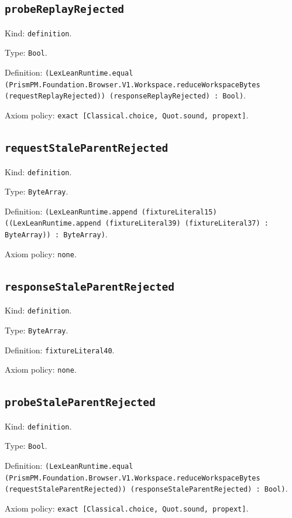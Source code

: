 \documentclass[11pt]{article}
\begin{document}
\subsection*{\texttt{probeReplayRejected}}
\noindent Kind: \texttt{definition}.\par
\noindent Type: \texttt{Bool}.\par
\noindent Definition: \texttt{(LexLeanRuntime.equal (PrismPM.Foundation.Browser.V1.Workspace.reduceWorkspaceBytes (requestReplayRejected)) (responseReplayRejected) : Bool)}.\par
\noindent Axiom policy: \texttt{exact [Classical.choice, Quot.sound, propext]}.\par
\subsection*{\texttt{requestStaleParentRejected}}
\noindent Kind: \texttt{definition}.\par
\noindent Type: \texttt{ByteArray}.\par
\noindent Definition: \texttt{(LexLeanRuntime.append (fixtureLiteral15) ((LexLeanRuntime.append (fixtureLiteral39) (fixtureLiteral37) : ByteArray)) : ByteArray)}.\par
\noindent Axiom policy: \texttt{none}.\par
\subsection*{\texttt{responseStaleParentRejected}}
\noindent Kind: \texttt{definition}.\par
\noindent Type: \texttt{ByteArray}.\par
\noindent Definition: \texttt{fixtureLiteral40}.\par
\noindent Axiom policy: \texttt{none}.\par
\subsection*{\texttt{probeStaleParentRejected}}
\noindent Kind: \texttt{definition}.\par
\noindent Type: \texttt{Bool}.\par
\noindent Definition: \texttt{(LexLeanRuntime.equal (PrismPM.Foundation.Browser.V1.Workspace.reduceWorkspaceBytes (requestStaleParentRejected)) (responseStaleParentRejected) : Bool)}.\par
\noindent Axiom policy: \texttt{exact [Classical.choice, Quot.sound, propext]}.\par
\end{document}
